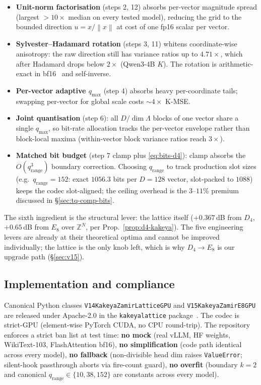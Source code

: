 \documentclass[10pt,a4paper]{article}
\theoremstyle{definition}
\theoremstyle{plain}
\newcommand{\Z}{\mathbb{Z}}
\newcommand{\norm}[1]{\left\lVert#1\right\rVert}
\begin{document}
\begin{itemize}[leftmargin=*]
  \item \textbf{Unit-norm factorisation} (steps 2, 12) absorbs
    per-vector magnitude spread (largest $>10\times$ median on
    every tested model), reducing the grid to the bounded
    direction $u=x/\norm{x}$ at cost of one fp16 scalar per
    vector.
  \item \textbf{Sylvester--Hadamard rotation} (steps 3, 11)
    whitens coordinate-wise anisotropy: the raw direction still
    has variance ratios up to $4.71\times$, which after
    Hadamard drops below $2\times$ (Qwen3-4B $K$). The rotation
    is arithmetic-exact in bf16~\cite{quip-hash,quip-sharp} and
    self-inverse.
  \item \textbf{Per-vector adaptive $q_\mathrm{max}$} (step 4)
    absorbs heavy per-coordinate tails; swapping per-vector for
    global scale costs $\sim\!4\times$ K-MSE.
  \item \textbf{Joint quantisation} (step 6): all $D/\dim\Lambda$
    blocks of one vector share a single $q_\mathrm{max}$, so
    bit-rate allocation tracks the per-vector envelope rather than
    block-local maxima (within-vector block variance ratios reach
    $3\times$).
  \item \textbf{Matched bit budget} (step 7 clamp plus
    \eqref{eq:bits-d4}): clamp absorbs the
    $O(q_\mathrm{range}^3)$ boundary correction. Choosing
    $q_\mathrm{range}$ to track production slot sizes
    (e.g.\ $q_\mathrm{range}=152$: exact $1056.3$ bits per
    $D=128$ vector, slot-packed to $1088$) keeps the codec
    slot-aligned; the ceiling overhead is the $3$--$11\%$
    premium discussed in \S\ref{sec:tq-comp-bits}.
\end{itemize}

The sixth ingredient is the structural lever: the lattice itself
($+0.367\,$dB from $D_4$, $+0.65\,$dB from $E_8$ over $\Z^N$,
per Prop.~\ref{prop:d4-kakeya}). The five engineering levers are
already at their theoretical optima and cannot be improved
individually; the lattice is the only knob left, which is why
$D_4 \to E_8$ is our upgrade path (\S\ref{sec:v15}).

\subsection{Implementation and compliance}

Canonical Python classes \texttt{V14KakeyaZamirLatticeGPU} and
\texttt{V15KakeyaZamirE8GPU} are released under Apache-2.0 in the
\texttt{kakeyalattice} package~\cite{kakeya-v14-release}. The
codec is strict-GPU (element-wise PyTorch CUDA, no CPU
round-trip). The repository enforces a strict ban list at test
time: \textbf{no mock} (real vLLM, HF weights, WikiText-103,
FlashAttention bf16), \textbf{no simplification} (code path
identical across every model), \textbf{no fallback}
(non-divisible head dim raises \texttt{ValueError}; silent-hook
passthrough aborts via fire-count guard), \textbf{no overfit}
(boundary $k=2$ and canonical $q_\mathrm{range} \in \{10,38,152\}$
are constants across every model).
\end{document}
